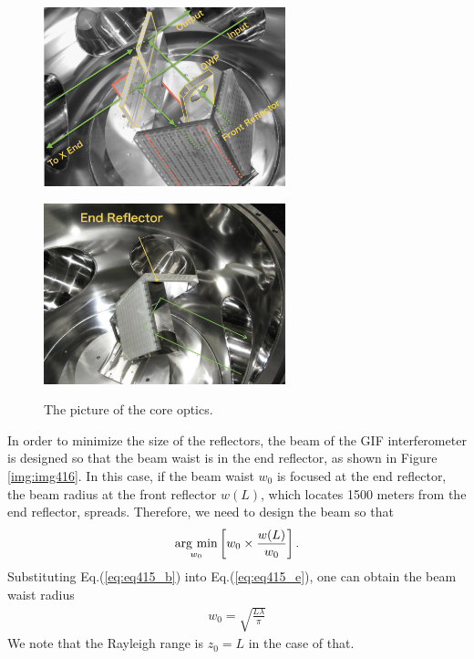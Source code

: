 \begin{figure}[h]
  \begin{minipage}[b]{0.5\hsize}
    \begin{center}   
      \includegraphics[width=7cm]{./img_chap4/img418.png} %
      \label{img:img418}
    \end{center}
  \end{minipage}\hspace{0.1cm}
  \begin{minipage}[b]{0.5\hsize}
    \begin{center}   
      \includegraphics[width=7cm]{./img_chap4/img419.png} %
      \label{img:img419}
    \end{center}
  \end{minipage}
  \caption{The picture of the core optics.}  
\end{figure}


In order to minimize the size of the reflectors, the beam of the GIF interferometer is designed so that the beam waist is in the end reflector, as shown in Figure \ref{img:img416}. In this case, if the beam waist $w_0$ is focused at the end reflector, the beam radius at the front reflector $w(L)$, which locates 1500 meters from the end reflector, spreads. Therefore, we need to design the beam so that
\begin{eqnarray}
  \mathop{\rm arg~min}\limits_{w_0} \left[w_0\times\frac{w(L)}{w_0}\right]. \label{eq:eq415_e}
\end{eqnarray}
Substituting Eq.(\ref{eq:eq415_b}) into Eq.(\ref{eq:eq415_e}), one can obtain the beam waist radius
\begin{eqnarray}
  w_0 = \sqrt{\frac{{L\lambda}}{\pi}} \label{eq:eq415b}
\end{eqnarray}
We note that the Rayleigh range is $z_0 = L$ in the case of that.

